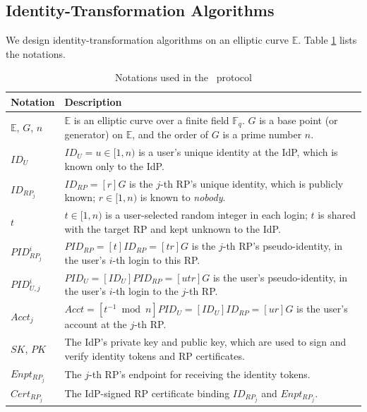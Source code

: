 \subsection{Identity-Transformation Algorithms}
\label{subsec:overview}

We design identity-transformation algorithms %
on an elliptic curve $\mathbb{E}$.
Table \ref{tbl:notations-protocol} lists the notations.


\begin{table}[tb]
\footnotesize
    \caption{Notations used in the \usso\ protocol}
    \centering
    \begin{tabular}{|p{0.93cm}|p{6.71cm}|} \hline
    {\textbf{Notation}} & {\textbf{Description}} \\ \hline
    {$\mathbb{E}$, $G$, $n$} & {$\mathbb{E}$ is an elliptic curve over a finite field $\mathbb{F}_q$. $G$ is a base point (or generator) on $\mathbb{E}$, and the order of $G$ is a prime number $n$.} \\ \hline
    {$ID_U$} & {$ID_U = u \in [1, n)$ is a user's unique identity at the IdP, which is known only to the IdP.} \\ \hline
   {$ID_{RP_j}$} & {$ID_{RP} = [r]G$ is the $j$-th RP's unique identity, which is publicly known; $r \in [1, n)$ is known to \emph{nobody}.} \\ \hline
    {$t$} & {$t \in [1, n)$ is a user-selected random integer in each login; $t$ is shared with the target RP and kept unknown to the IdP.} \\ \hline
    {$PID_{RP_j}^i$} & {$PID_{RP} = [t]{ID_{RP}} = [tr]G$ is the $j$-th RP's pseudo-identity, in the user's $i$-th login to this RP.} \\ \hline
    {$PID_{U,j}^i$} & {$PID_U = [{ID_U}]{PID_{RP}} = [utr]G$ is the user's pseudo-identity, in the user's $i$-th login to the $j$-th RP.} \\ \hline
     {$Acct_j$} & {$Acct = [t^{-1}\bmod n]PID_{U} = [ID_U]ID_{RP} = [ur]G$ is the user's account at the $j$-th RP.} \\ \hline
    {$SK$, $PK$} & {The IdP's private key and public key, which are used to sign and verify identity tokens and RP certificates.} \\ \hline
    {$Enpt_{RP_j}$} & {The $j$-th RP's endpoint for receiving the identity tokens.} \\ \hline
    {$Cert_{RP_j}$} & {The IdP-signed RP certificate binding $ID_{RP_j}$ and $Enpt_{RP_j}$.} \\ \hline
    \end{tabular}
    \label{tbl:notations-protocol}
\end{table}

